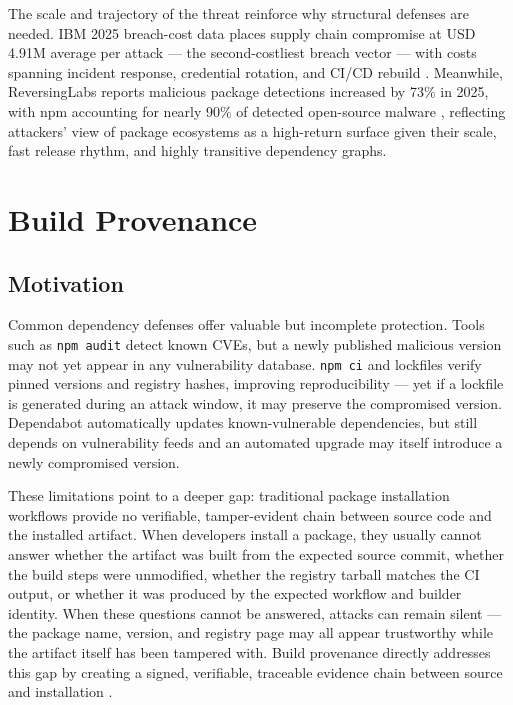\documentclass[12pt,a4paper]{article}
\begin{document}
The scale and trajectory of the threat reinforce why structural defenses are needed. IBM 2025 breach-cost data places supply chain compromise at USD 4.91M average per attack --- the second-costliest breach vector --- with costs spanning incident response, credential rotation, and CI/CD rebuild \cite{ibm-cost}. Meanwhile, ReversingLabs reports malicious package detections increased by 73\% in 2025, with npm accounting for nearly 90\% of detected open-source malware \cite{reversinglabs}, reflecting attackers' view of package ecosystems as a high-return surface given their scale, fast release rhythm, and highly transitive dependency graphs.

\section{Build Provenance}

\subsection{Motivation}

Common dependency defenses offer valuable but incomplete protection. Tools such as \texttt{npm audit} detect known CVEs, but a newly published malicious version may not yet appear in any vulnerability database. \texttt{npm ci} and lockfiles verify pinned versions and registry hashes, improving reproducibility --- yet if a lockfile is generated during an attack window, it may preserve the compromised version. Dependabot automatically updates known-vulnerable dependencies, but still depends on vulnerability feeds and an automated upgrade may itself introduce a newly compromised version.

These limitations point to a deeper gap: traditional package installation workflows provide no verifiable, tamper-evident chain between source code and the installed artifact. When developers install a package, they usually cannot answer whether the artifact was built from the expected source commit, whether the build steps were unmodified, whether the registry tarball matches the CI output, or whether it was produced by the expected workflow and builder identity. When these questions cannot be answered, attacks can remain silent --- the package name, version, and registry page may all appear trustworthy while the artifact itself has been tampered with. Build provenance directly addresses this gap by creating a signed, verifiable, traceable evidence chain between source and installation \cite{slsa-about}.
\end{document}
